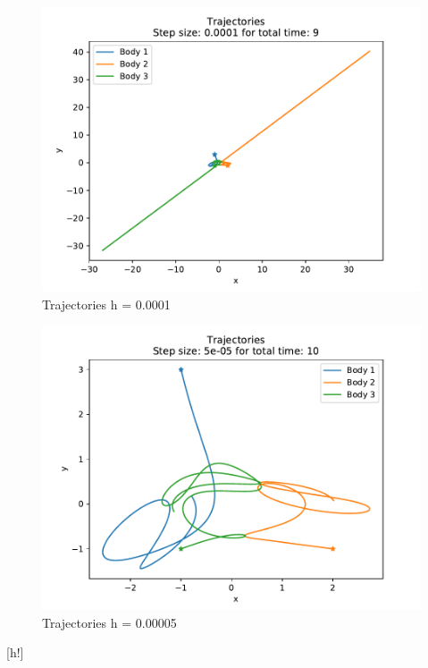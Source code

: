 \documentclass[12pt,a4paper,twoside]{article}
\begin{document}
\begin{figure}[h]
   \centering
   \includegraphics[]{figs/exercise03_2_stepsize00001_time9.pdf}
   \caption{Trajectories h = 0.0001}
\end{figure}
\begin{figure}[h]
  \centering
  \includegraphics[]{figs/exercise03_2_stepsize5e-05_time10.pdf}
  \caption{Trajectories h = 0.00005}
\end{figure}[h!]
\end{document}
